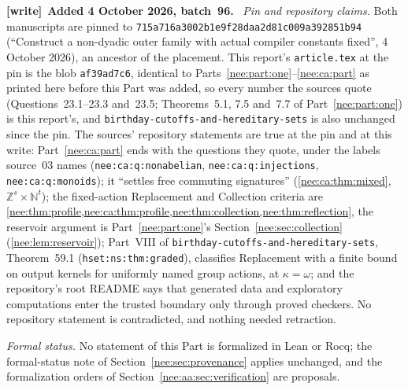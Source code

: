 \documentclass[11pt,letterpaper]{article}
\numberwithin{equation}{section}
\theoremstyle{plain}
\theoremstyle{definition}
\theoremstyle{remark}
\newcommand{\NN}{\mathbb N}
\newcommand{\ZZ}{\mathbb Z}
\newenvironment{writenote}[1][]{\par\smallskip\begingroup\small\raggedright
 \setlength{\parindent}{1.25em}\noindent\textbf{[write]}\if\relax\detokenize{#1}\relax\else~\textbf{#1.}\fi\ }%
 {\par\endgroup\smallskip}
\begin{document}
\begin{writenote}[Added 4 October 2026, batch~96]
\emph{Pin and repository claims.} Both manuscripts are pinned to \texttt{715a716a3002b1e9f28daa2d81c009a392851b94} (``Construct a non-dyadic outer family with actual compiler constants fixed'', 4 October 2026), an ancestor of the placement. This report's \texttt{article.tex} at the pin is the blob \texttt{af39ad7c6}, identical to Parts~\ref{nee:part:one}--\ref{nee:ca:part} as printed here before this Part was added, so every number the sources quote (Questions~23.1--23.3 and~23.5; Theorems~5.1, 7.5 and~7.7 of Part~\ref{nee:part:one}) is this report's, and \nolinkurl{birthday-cutoffs-and-hereditary-sets} is also unchanged since the pin. The sources' repository statements are true at the pin and at this write: Part~\ref{nee:ca:part} ends with the questions they quote, under the labels source~03 names (\texttt{nee:ca:q:nonabelian}, \texttt{nee:ca:q:injections}, \texttt{nee:ca:q:monoids}); it ``settles free commuting signatures'' (\cref{nee:ca:thm:mixed}, $\ZZ^s\times\NN^t$); the fixed-action Replacement and Collection criteria are \cref{nee:thm:profile,nee:ca:thm:profile,nee:thm:collection,nee:thm:reflection}, the reservoir argument is Part~\ref{nee:part:one}'s Section~\ref{nee:sec:collection} (\cref{nee:lem:reservoir}); Part~VIII of \nolinkurl{birthday-cutoffs-and-hereditary-sets}, Theorem~59.1 (\texttt{hset:ns:thm:graded}), classifies Replacement with a finite bound on output kernels for uniformly named group actions, at $\kappa=\omega$; and the repository's root README says that generated data and exploratory computations enter the trusted boundary only through proved checkers. No repository statement is contradicted, and nothing needed retraction.

\emph{Formal status.} No statement of this Part is formalized in Lean or Rocq; the formal-status note of Section~\ref{nee:sec:provenance} applies unchanged, and the formalization orders of Section~\ref{nee:aa:sec:verification} are proposals.


\end{writenote}
\end{document}
